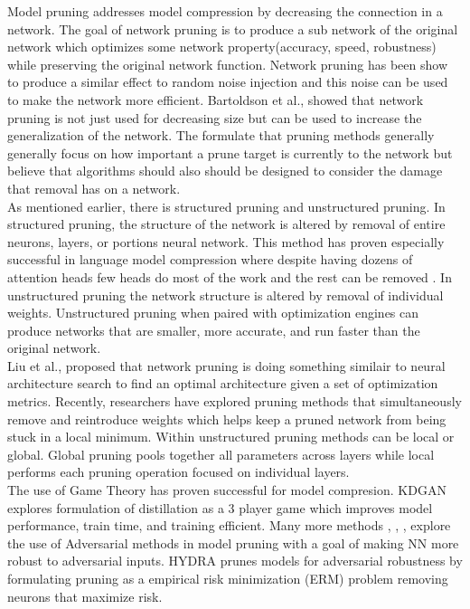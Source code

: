 \documentclass[11pt]{article}
\begin{document}
Model pruning \cite{LeCun1989OptimalBD} addresses model compression by decreasing the connection in a network. The goal of network pruning is to produce a sub network of the original network which optimizes some network property(accuracy, speed, robustness) while preserving the original network function. Network pruning has been show to produce a similar effect to random noise injection \cite{Bartoldson2019TheGT} and this noise can be used to make the network more efficient. Bartoldson et al., showed that network pruning is not just used for decreasing size but can be used to increase the generalization of the network. The formulate that pruning methods generally generally focus on how important a prune target is currently to the network but believe that algorithms should also should be designed to consider the damage that removal has on a network.  \\
As mentioned earlier, there is structured pruning and unstructured pruning. In structured pruning, the structure of the network is altered by removal of entire neurons, layers, or portions neural network. This method has proven especially successful in language model compression where despite having dozens of attention heads \cite{Vaswani2017AttentionIA} few heads do most of the work and the rest can be removed \cite{Michel2019AreSH}. In unstructured pruning the network structure is altered by removal of individual weights. Unstructured pruning when paired with optimization engines can produce networks that are smaller, more accurate, and run faster than the original network. \\
Liu et al., \cite{Liu2019RethinkingTV} proposed that network pruning is doing something similair to neural architecture search to find an optimal architecture given a set of optimization metrics. Recently, researchers have explored pruning methods that simultaneously remove and reintroduce weights \cite{Jia2020StochasticMP} which helps keep a pruned network from being stuck in a local minimum. Within unstructured pruning methods can be local or global. Global pruning pools together all parameters across layers while local performs each pruning operation focused on individual layers. \\
The use of Game Theory has proven successful for model compresion. KDGAN \cite{Wang2018KDGANKD} explores formulation of distillation as a 3 player game which
improves model performance, train time, and training efficient. Many more
methods \cite{Guo2018SparseDW} \cite{Dhillon2018StochasticAP}, \cite{Sehwag2020OnPA}, \cite{Xie2020BlindAP}, explore the use of Adversarial methods in model
pruning with a goal of making NN more robust to adversarial inputs. HYDRA \cite{Sehwag2020HYDRAPA} prunes models for adversarial robustness by formulating pruning as a empirical risk minimization (ERM) problem removing neurons that maximize risk.
\end{document}

